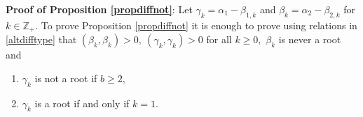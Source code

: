 \documentclass[12pt,reqno]{amsart}
\theoremstyle{plain}
\theoremstyle{definition}
\theoremstyle{remark}
\newcommand\bz{\mathbb Z}
\begin{document}




\medskip

\noindent \textbf{Proof of Proposition \ref{propdiffnot}}:
Let $\gamma_k=\alpha_1-\beta_{1,k}$ and $\beta_k=\alpha_2-\beta_{2,k}$ for $k\in\bz_+.$ To prove Proposition \ref{propdiffnot}  it is enough to prove using relations in \ref{altdifftype} that $(\beta_k,\beta_k)>0,\ (\gamma_k,\gamma_k)>0$ for all $k\geq 0,$ $\beta_k$ is never a root and 
\begin{enumerate}
    \item $\gamma_k$ is not a root if $b\geq 2,$
    \item $\gamma_k$ is a root if and only if $k=1.$
\end{enumerate}
\end{document}
